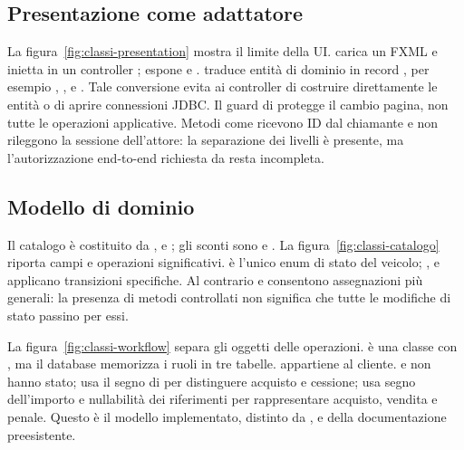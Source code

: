 \subsection{Presentazione come adattatore}
La figura~\ref{fig:classi-presentation} mostra il limite della UI.  carica un FXML e inietta  in un controller ;  espone  e .  traduce entità di dominio in record , per esempio , ,  e . Tale conversione evita ai controller di costruire direttamente le entità o di aprire connessioni JDBC.
Il guard di  protegge il cambio pagina, non tutte le operazioni applicative. Metodi come  ricevono ID dal chiamante e non rileggono la sessione dell'attore: la separazione dei livelli è presente, ma l'autorizzazione end-to-end richiesta da  resta incompleta.

\clearpage
\subsection{Modello di dominio}
Il catalogo è costituito da ,  e ; gli sconti sono  e . La figura~\ref{fig:classi-catalogo} riporta campi e operazioni significativi.  è l'unico enum di stato del veicolo; ,  e  applicano transizioni specifiche. Al contrario  e  consentono assegnazioni più generali: la presenza di metodi controllati non significa che tutte le modifiche di stato passino per essi.

La figura~\ref{fig:classi-workflow} separa gli oggetti delle operazioni.  è una classe con , ma il database memorizza i ruoli in tre tabelle.  appartiene al cliente.  e  non hanno stato;  usa il segno di  per distinguere acquisto e cessione;  usa segno dell'importo e nullabilità dei riferimenti per rappresentare acquisto, vendita e penale. Questo è il modello implementato, distinto da ,  e  della documentazione preesistente.

